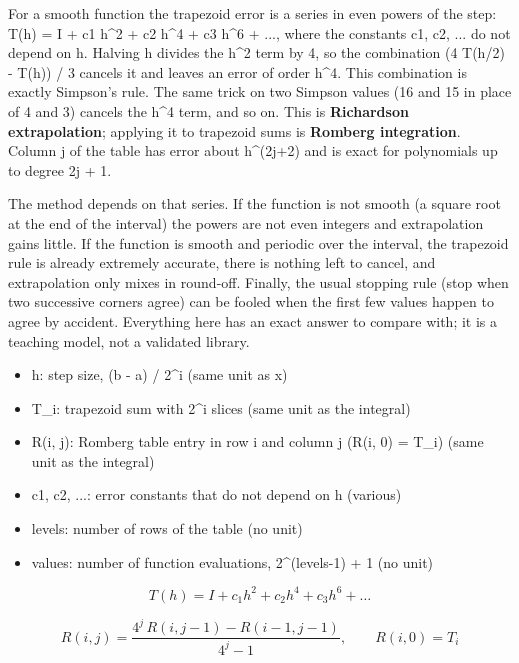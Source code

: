 \documentclass[11pt,a4paper]{article}
\begin{document}
For a smooth function the trapezoid error is a series in even powers of the step: T(h) = I + c1 h\textasciicircum{}2 + c2 h\textasciicircum{}4 + c3 h\textasciicircum{}6 + ..., where the constants c1, c2, ... do not depend on h. Halving h divides the h\textasciicircum{}2 term by 4, so the combination (4 T(h/2) - T(h)) / 3 cancels it and leaves an error of order h\textasciicircum{}4. This combination is exactly Simpson's rule. The same trick on two Simpson values (16 and 15 in place of 4 and 3) cancels the h\textasciicircum{}4 term, and so on. This is \textbf{Richardson extrapolation}; applying it to trapezoid sums is \textbf{Romberg integration}. Column j of the table has error about h\textasciicircum{}(2j+2) and is exact for polynomials up to degree 2j + 1.

The method depends on that series. If the function is not smooth (a square root at the end of the interval) the powers are not even integers and extrapolation gains little. If the function is smooth and periodic over the interval, the trapezoid rule is already extremely accurate, there is nothing left to cancel, and extrapolation only mixes in round-off. Finally, the usual stopping rule (stop when two successive corners agree) can be fooled when the first few values happen to agree by accident. Everything here has an exact answer to compare with; it is a teaching model, not a validated library.

\begin{itemize}[nosep]
\item h: step size, (b - a) / 2\textasciicircum{}i (same unit as x)
\item T\_i: trapezoid sum with 2\textasciicircum{}i slices (same unit as the integral)
\item R(i, j): Romberg table entry in row i and column j (R(i, 0) = T\_i) (same unit as the integral)
\item c1, c2, ...: error constants that do not depend on h (various)
\item levels: number of rows of the table (no unit)
\item values: number of function evaluations, 2\textasciicircum{}(levels-1) + 1 (no unit)
\end{itemize}

\begin{equation*}
T(h)=I+c_1h^2+c_2h^4+c_3h^6+\dots
\end{equation*}

\begin{equation*}
R(i,j)=\frac{4^{j}\,R(i,j-1)-R(i-1,j-1)}{4^{j}-1},\qquad R(i,0)=T_i
\end{equation*}
\end{document}
